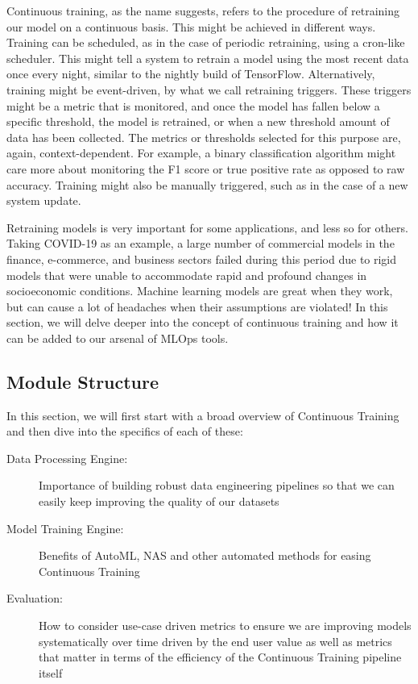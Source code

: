 {{{{  Continuous training, as the name suggests, refers to the procedure of retraining our model on a continuous basis. This might be achieved in different ways. Training can be scheduled, as in the case of periodic retraining, using a cron-like scheduler. This might tell a system to retrain a model using the most recent data once every night, similar to the nightly build of TensorFlow. Alternatively, training might be event-driven, by what we call retraining triggers. These triggers might be a metric that is monitored, and once the model has fallen below a specific threshold, the model is retrained, or when a new threshold amount of data has been collected. The metrics or thresholds selected for this purpose are, again, context-dependent. For example, a binary classification algorithm might care more about monitoring the F1 score or true positive rate as opposed to raw accuracy. Training might also be manually triggered, such as in the case of a new system update.
  
  Retraining models is very important for some applications, and less so for others. Taking COVID-19 as an example, a large number of commercial models in the finance, e-commerce, and business sectors failed during this period due to rigid models that were unable to accommodate rapid and profound changes in socioeconomic conditions. Machine learning models are great when they work, but can cause a lot of headaches when their assumptions are violated! In this section, we will delve deeper into the concept of continuous training and how it can be added to our arsenal of MLOps tools.
  
  \subsection{Module Structure}
  In this section, we will first start with a broad overview of Continuous Training and then dive into the specifics of each of these:
  
  \begin{description}
    \item[Data Processing Engine:] Importance of building robust data engineering pipelines so that we can easily keep improving the quality of our datasets
    \item [Model Training Engine:] Benefits of AutoML, NAS and other automated methods for easing Continuous Training
    \item [Evaluation:] How to consider use-case driven metrics to ensure we are improving models systematically over time driven by the end user value as well as metrics that matter in terms of the efficiency of the Continuous Training pipeline itself      
  \end{description}
        
}}}}
